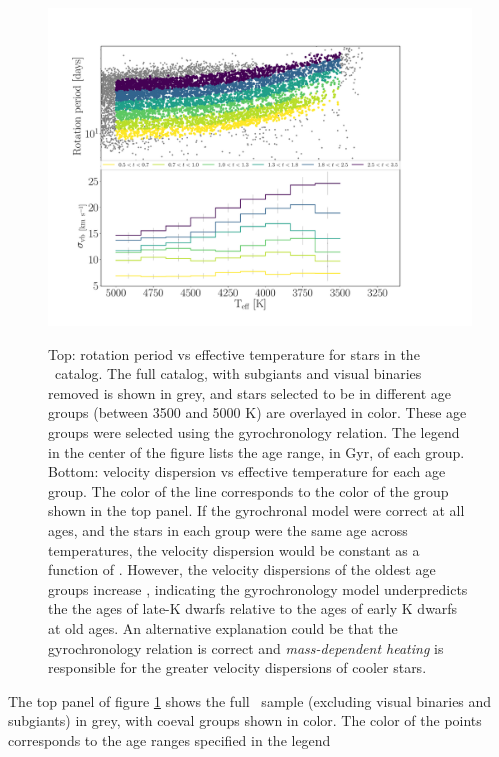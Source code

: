 \begin{figure}
  \caption{
Top: rotation period vs effective temperature for stars in the \mct\
    catalog.
    The full catalog, with subgiants and visual binaries removed is shown in
    grey, and stars selected to be in different age groups (between 3500 and
    5000 K) are overlayed in color.
These age groups were selected using the \citet{angus2019} gyrochronology
    relation.
The legend in the center of the figure lists the age range, in Gyr, of each
    group.
Bottom: velocity dispersion vs effective temperature for each age
    group.
The color of the line corresponds to the color of the group shown in the top
    panel.
If the gyrochronal model were correct at all ages, and the stars in each group
    were the same age across temperatures, the velocity dispersion would be
    constant as a function of \teff.
However, the velocity dispersions of the oldest age groups increase \teff,
    indicating the \citet{angus2019} gyrochronology model underpredicts the
    the ages of late-K dwarfs relative to the ages of early K dwarfs at old
    ages.
An alternative explanation could be that the gyrochronology relation is
    correct and {\it mass-dependent heating} is responsible for the greater
    velocity dispersions of cooler stars.
}
  \centering
    \includegraphics[width=1\textwidth]{age_cut}
\label{fig:age_cut}
\end{figure}
The top panel of figure \ref{fig:age_cut} shows the full \mct\ sample
(excluding visual binaries and subgiants) in grey, with coeval groups shown in
color.
The color of the points corresponds to the age ranges specified in the legend
